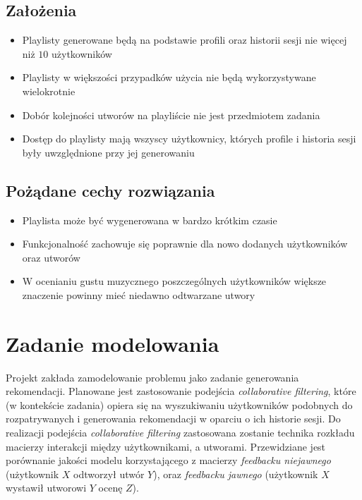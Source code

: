 \documentclass[10pt,a4paper]{article}
\begin{document}
\subsection{Założenia}
\begin{itemize}
	\item Playlisty generowane będą na podstawie profili oraz historii sesji nie więcej niż $10$ użytkowników 	
	\item Playlisty w większości przypadków użycia nie będą wykorzystywane wielokrotnie
	\item Dobór kolejności utworów na playliście nie jest przedmiotem zadania
	\item Dostęp do playlisty mają wszyscy użytkownicy, których profile i historia sesji były uwzględnione przy jej generowaniu
\end{itemize}

\subsection{Pożądane cechy rozwiązania}
\begin{itemize}

\item Playlista może być wygenerowana w bardzo krótkim czasie

\item Funkcjonalność zachowuje się poprawnie dla nowo dodanych użytkowników oraz utworów

\item W ocenianiu gustu muzycznego poszczególnych użytkowników większe znaczenie powinny mieć niedawno odtwarzane utwory

\end{itemize}

\section{Zadanie modelowania}
	
Projekt zakłada zamodelowanie problemu jako zadanie generowania rekomendacji. Planowane jest zastosowanie podejścia \textit{collaborative filtering}, które (w kontekście zadania) opiera się na wyszukiwaniu użytkowników podobnych do rozpatrywanych i generowania rekomendacji w oparciu o ich historie sesji. Do realizacji podejścia \textit{collaborative filtering} zastosowana zostanie technika rozkładu macierzy interakcji między użytkownikami, a utworami. Przewidziane jest porównanie jakości modelu korzystającego z macierzy \textit{feedbacku niejawnego} (użytkownik $X$ odtworzył utwór $Y$), oraz \textit{feedbacku jawnego} (użytkownik $X$ wystawił utworowi $Y$ ocenę $Z$).
\end{document}
